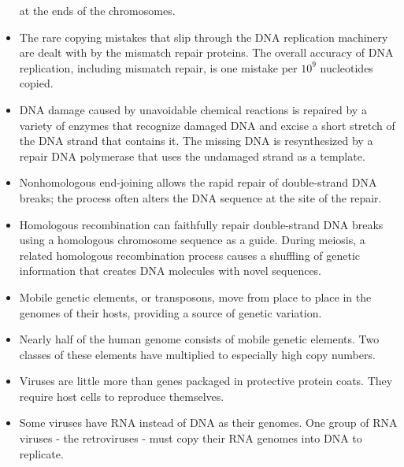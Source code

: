 \begin{itemize}
at the ends of the chromosomes.
\item The rare copying mistakes that slip through the DNA replication
machinery are dealt with by the mismatch repair proteins. The overall
accuracy of DNA replication, including mismatch repair, is one
mistake per $10^9$ nucleotides copied.
\item DNA damage caused by unavoidable chemical reactions is repaired
by a variety of enzymes that recognize damaged DNA and excise a
short stretch of the DNA strand that contains it. The missing DNA is
resynthesized by a repair DNA polymerase that uses the undamaged
strand as a template.
\item Nonhomologous end-joining allows the rapid repair of double-strand
DNA breaks; the process often alters the DNA sequence at the site of
the repair.
\item Homologous recombination can faithfully repair double-strand DNA
breaks using a homologous chromosome sequence as a guide. During
meiosis, a related homologous recombination process causes a shuffling
of genetic information that creates DNA molecules with novel
sequences.
\item Mobile genetic elements, or transposons, move from place to place in
the genomes of their hosts, providing a source of genetic variation.
\item Nearly half of the human genome consists of mobile genetic elements.
Two classes of these elements have multiplied to especially
high copy numbers.
\item Viruses are little more than genes packaged in protective protein
coats. They require host cells to reproduce themselves.
\item Some viruses have RNA instead of DNA as their genomes. One group
of RNA viruses - the retroviruses - must copy their RNA genomes into
DNA to replicate.
\end{itemize}
